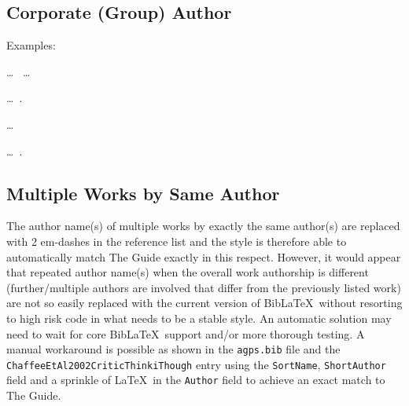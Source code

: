 \documentclass[a4paper, 11pt]{article}
\newcommand*{\BibLaTeX}{Bib\LaTeX}
\newcommand*{\subsectionRefSection}[1]{
    \subsection{#1}
    \refsection
}
\newcommand*{\printsubbibliographyEndRefSection}{
    \printbibliography[heading=subbibliography, title=Reference]
    \endrefsection
}
\newenvironment{agpsExample}{
    \setlength{\parindent}{0pt}
    \medskip
}
{}
\newenvironment{bareList}{%
    \begin{list}{}{}%
}
{\end{list}}
\begin{document}
\printsubbibliographyEndRefSection

\subsectionRefSection{Corporate (Group) Author}

\begin{agpsExample}

    Examples:

    \begin{bareList}
        \item \ldots\ \textcite[2-3]{UrapunLandClaim2001} \ldots
        \item \ldots\ \autocite[2-3]{UrapunLandClaim2001}.
        \item \textcite[9]{PCSC1983QueensPlanniCommit} \ldots
        \item \ldots\ \autocite[9]{PCSC1983QueensPlanniCommit}.
        \item \autocite{OfficeoftheAboriginalLandCommissioner2001UrapunLandClaim}
    \end{bareList}

\end{agpsExample}

\printsubbibliographyEndRefSection

\subsectionRefSection{Multiple Works by Same Author}

The author name(s) of multiple works by exactly the same author(s) are replaced with 2 em-dashes in
the reference list and the style is therefore able to automatically match The Guide exactly in this
respect.  However, it would appear that repeated author name(s) when the overall work authorship is
different (further/multiple authors are involved that differ from the previously listed work) are
not so easily replaced with the current version of \BibLaTeX\ without resorting to high risk code in
what needs to be a stable style. An automatic solution may need to wait for core \BibLaTeX\ support
and/or more thorough testing. A manual workaround is possible as shown in the \texttt{agps.bib} file
and the \texttt{ChaffeeEtAl2002CriticThinkiThough} entry using the \texttt{SortName},
\texttt{ShortAuthor} field and a sprinkle of \LaTeX\ in the \texttt{Author} field to achieve an
exact match to The Guide.
\end{document}
